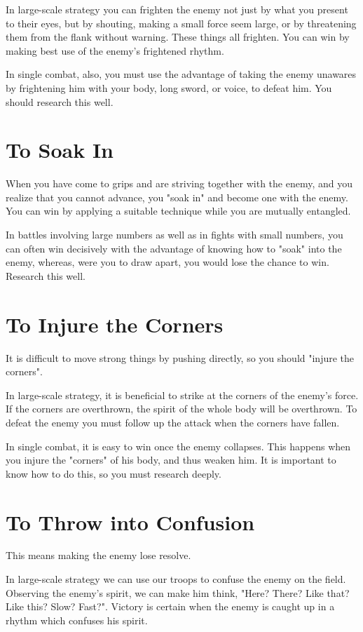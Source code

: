 \documentclass[12pt]{report}
\begin{document}
In large-scale strategy you can frighten the enemy not just by what you present to their eyes, but by shouting, making a small force seem large, or by threatening them from the flank without warning. These things all frighten. You can win by making best use of the enemy's frightened rhythm.

In single combat, also, you must use the advantage of taking the enemy unawares by frightening him with your body, long sword, or voice, to defeat him. You should research this well.
\section*{To Soak In}

When you have come to grips and are striving together with the enemy, and you realize that you cannot advance, you "soak in" and become one with the enemy. You can win by applying a suitable technique while you are mutually entangled.

In battles involving large numbers as well as in fights with small numbers, you can often win decisively with the advantage of knowing how to "soak" into the enemy, whereas, were you to draw apart, you would lose the chance to win. Research this well.
\section*{To Injure the Corners}
It is difficult to move strong things by pushing directly, so you should "injure the corners".

In large-scale strategy, it is beneficial to strike at the corners of the enemy's force. If the corners are overthrown, the spirit of the whole body will be overthrown. To defeat the enemy you must follow up the attack when the corners have fallen.

In single combat, it is easy to win once the enemy collapses. This happens when you injure the "corners" of his body, and thus weaken him. It is important to know how to do this, so you must research deeply.
\section*{To Throw into Confusion}
This means making the enemy lose resolve.

In large-scale strategy we can use our troops to confuse the enemy on the field. Observing the enemy's spirit, we can make him think, "Here? There? Like that? Like this? Slow? Fast?". Victory is certain when the enemy is caught up in a rhythm which confuses his spirit.
\end{document}
